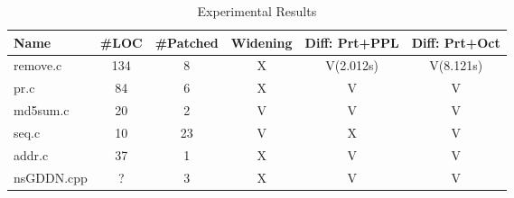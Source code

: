 \begin{table*}[htbp]
  \footnotesize
  \centering
  \caption{Experimental Results}
    \begin{tabular}{lccccc}
    \hline
    \textbf{Name} & \textbf{\#LOC} & \textbf{\#Patched} & \textbf{Widening} &  \textbf{Diff: Prt+PPL} &  \textbf{Diff: Prt+Oct} \\
    \hline
            remove.c  & 134 & 8  & X & V(2.012s) & V(8.121s) \\
                pr.c  & 84  & 6  & X & V         & V         \\
            md5sum.c  & 20  & 2  & V & V         & V         \\ 
               seq.c  & 10  & 23 & V & X         & V         \\
              addr.c  & 37  & 1  & X & V         & V         \\
          nsGDDN.cpp  & ?   & 3  & X & V         & V         \\
    \hline
    \end{tabular}%
\end{table*}%